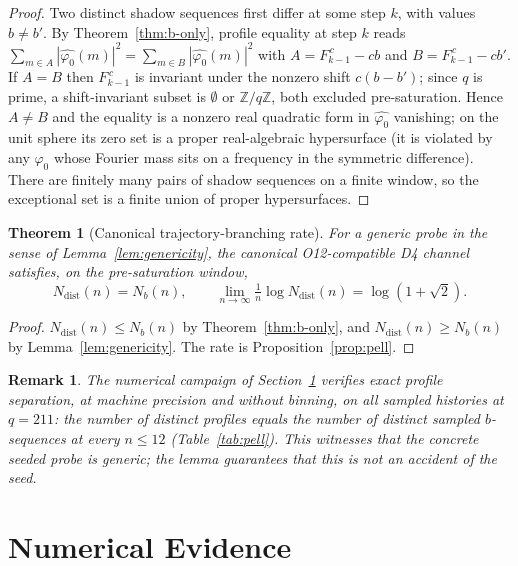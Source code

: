 \documentclass[11pt]{article}
\newtheorem{theorem}{Theorem}
\newtheorem{remark}{Remark}
\newcommand{\Zq}{\mathbb{Z}/q\mathbb{Z}}
\newcommand{\Ndist}{N_{\mathrm{dist}}}
\newcommand{\Nb}{N_b}
\begin{document}
\begin{proof}
Two distinct shadow sequences first differ at some step $k$, with values $b\neq b'$.
By Theorem~\ref{thm:b-only}, profile equality at step $k$ reads
$\sum_{m\in A}|\widehat{\varphi_0}(m)|^2=\sum_{m\in B}|\widehat{\varphi_0}(m)|^2$ with
$A=F_{k-1}^{\,c}-cb$ and $B=F_{k-1}^{\,c}-cb'$.
If $A=B$ then $F_{k-1}^{\,c}$ is invariant under the nonzero shift $c(b-b')$; since $q$ is prime, a
shift-invariant subset is $\emptyset$ or $\Zq$, both excluded pre-saturation.
Hence $A\neq B$ and the equality is a nonzero real quadratic form in $\widehat{\varphi_0}$ vanishing; on the
unit sphere its zero set is a proper real-algebraic hypersurface (it is violated by any $\varphi_0$ whose
Fourier mass sits on a frequency in the symmetric difference).
There are finitely many pairs of shadow sequences on a finite window, so the exceptional set is a finite
union of proper hypersurfaces.
\end{proof}

\begin{theorem}[Canonical trajectory-branching rate]
\label{thm:branching-rate}
For a generic probe in the sense of Lemma~\ref{lem:genericity}, the canonical O12-compatible D4 channel
satisfies, on the pre-saturation window,
\[
\Ndist(n)=\Nb(n),
\qquad
\lim_{n\to\infty}\tfrac1n\log\Ndist(n)=\log(1+\sqrt2).
\]
\end{theorem}

\begin{proof}
$\Ndist(n)\le\Nb(n)$ by Theorem~\ref{thm:b-only}, and $\Ndist(n)\ge\Nb(n)$ by Lemma~\ref{lem:genericity}.
The rate is Proposition~\ref{prop:pell}.
\end{proof}

\begin{remark}
\label{rem:witness}
The numerical campaign of Section~\ref{sec:numerics} verifies exact profile separation, at machine precision
and without binning, on all sampled histories at $q=211$: the number of distinct profiles equals the number
of distinct sampled $b$-sequences at every $n\le 12$ (Table~\ref{tab:pell}).
This witnesses that the concrete seeded probe is generic; the lemma guarantees that this is not an accident
of the seed.
\end{remark}

\section{Numerical Evidence}
\label{sec:numerics}
\end{document}
